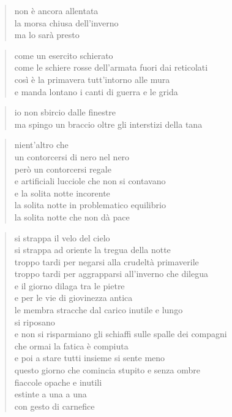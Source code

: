 \clearpage


\begin{verse}
    non è ancora allentata\\
    la morsa chiusa dell'inverno\\
    ma lo sarà presto
\end{verse}

\begin{verse}
    come un esercito schierato\\
    come le schiere rosse dell'armata fuori dai reticolati\\
    così è la primavera tutt'intorno alle mura\\
    e manda lontano i canti di guerra e le grida
\end{verse}

\begin{verse}
    io non sbircio dalle finestre\\
    ma spingo un braccio oltre gli interstizi della tana
\end{verse}

\clearpage


\begin{verse}
    nient’altro che\\
    un contorcersi di nero nel nero\\
    però un contorcersi regale\\
    e artificiali lucciole che non si contavano\\
    e la solita notte incorente\\
    la solita notte in problematico equilibrio\\
    la solita notte che non dà pace
\end{verse}

\clearpage


\begin{verse}
    si strappa il velo del cielo\\
    si strappa ad oriente la tregua della notte\\
    troppo tardi per negarsi alla crudeltà primaverile\\
    troppo tardi per aggrapparsi all'inverno che dilegua\\
    e il giorno dilaga tra le pietre\\
    e per le vie di giovinezza antica\\
    le membra stracche dal carico inutile e lungo\\
    si riposano\\
    e non si risparmiano gli schiaffi sulle spalle dei compagni\\
    che ormai la fatica è compiuta\\
    e poi a stare tutti insieme si sente meno\\
    questo giorno che comincia stupito e senza ombre\\
    fiaccole opache e inutili\\
    estinte a una a una\\
    con gesto di carnefice
\end{verse}

